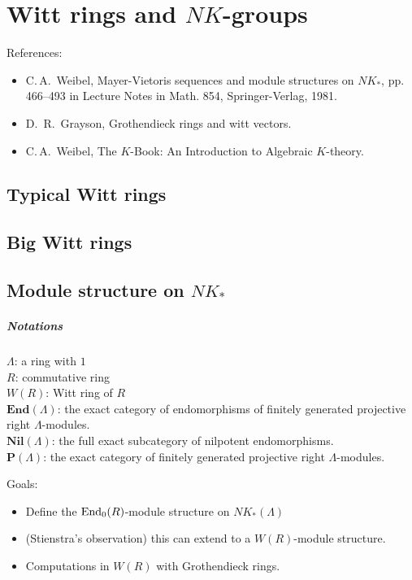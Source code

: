 \chapter{Witt rings and $NK$-groups}
References:
\begin{itemize}
	\item C.\,A.\ Weibel, Mayer-Vietoris sequences and module structures on $NK_*$, pp. 466–493 in Lecture Notes
in Math. 854, Springer-Verlag, 1981.
	\item D.\, R.\ Grayson, Grothendieck rings and witt vectors.
	\item C.\,A.\ Weibel, The $K$-Book: An Introduction to Algebraic $K$-theory.
\end{itemize}
\section{Typical Witt rings} %
\label{sec:typical_witt_rings}
\section{Big Witt rings} %
\label{sec:big_witt_rings}

\section{Module structure on $NK_*$} %
\label{sec:module_structure_on_}
\paragraph{Notations} $\Lambda$: a ring with $1$\\
$R$: commutative ring \\
$W(R)$: Witt ring of $R$\\
$\mathbf{End}(\Lambda)$: the exact category of endomorphisms of finitely generated projective right $\Lambda$-modules.\\
$\mathbf{Nil}(\Lambda)$: the full exact subcategory of nilpotent endomorphisms.\\
$\mathbf{P}(\Lambda)$: the exact category of finitely generated projective right $\Lambda$-modules.

Goals:
\begin{itemize}
	\item Define the $\mathrm{End}_0(R)$-module structure on $NK_*(\Lambda)$ 
	\item (Stienstra's observation) this can extend to a $W(R)$-module structure.
	\item Computations in $W(R)$ with Grothendieck rings.
\end{itemize}
